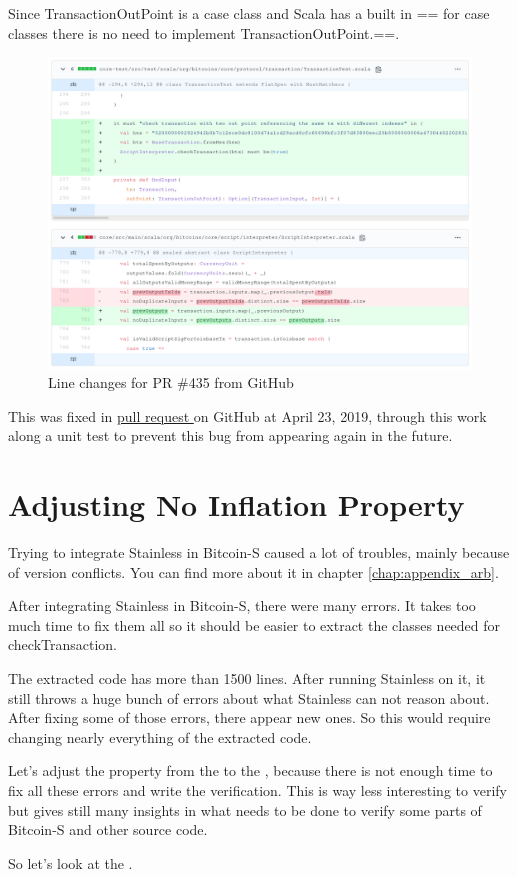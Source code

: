 Since TransactionOutPoint is a case class and Scala has a built in == for case classes there is no need to implement TransactionOutPoint.==.
\begin{figure}[H]
	\centering
		\includegraphics[scale=0.396]{images/bitcoin-s-pr.png}
	\caption{Line changes for PR \#435 from GitHub}
	\label{fig:output1}
\end{figure}

This was fixed in \href{https://github.com/bitcoin-s/bitcoin-s/pull/435}{pull request } on GitHub at April 23, 2019, through this work along a unit test to prevent this bug from appearing again in the future.


\section{Adjusting No Inflation Property}

Trying to integrate Stainless in Bitcoin-S caused a lot of troubles, mainly because of version conflicts.
You can find more about it in chapter \ref{chap:appendix_arb}.

After integrating Stainless in Bitcoin-S, there were many errors.
It takes too much time to fix them all so it should be easier to extract the classes needed for checkTransaction.

The extracted code has more than 1500 lines.
After running Stainless on it, it still throws a huge bunch of errors about what Stainless can not reason about.
After fixing some of those errors, there appear new ones.
So this would require changing nearly everything of the extracted code.

Let's adjust the property from the  to the , because there is not enough time to fix all these errors and write the verification.
This is way less interesting to verify but gives still many insights in what needs to be done to verify some parts of Bitcoin-S and other source code.

So let's look at the .
